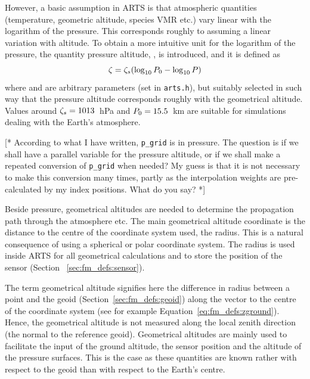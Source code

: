 However, a basic assumption in ARTS is that atmospheric quantities
(temperature, geometric altitude, species VMR etc.) vary linear with
the logarithm of the pressure. This corresponds roughly to assuming a
linear variation with altitude. To obtain a more intuitive unit for the
logarithm of the pressure, the quantity pressure altitude, \PrsAlt, is
introduced, and it is defined as
\begin{equation}
  \zeta = \zeta_{s}(\log_{10}P_{0} - \log_{10}P)
 \label{eq:fm_defs:prsalt}
\end{equation}
where  and  are arbitrary parameters (set in
\verb|arts.h|), but suitably selected in such way that the pressure
altitude corresponds roughly with the geometrical altitude. Values
around $\zeta_{s}=1013$~hPa and $P_{0}=15.5$~km are suitable for
simulations dealing with the Earth's atmosphere. 

[* According to what I have written, \verb|p_grid| is in pressure.
The question is if we shall have a parallel variable for the pressure
altitude, or if we shall make a repeated conversion of \verb|p_grid|
when needed? My guess is that it is not necessary to make this
conversion many times, partly as the interpolation weights are
pre-calculated by my index positions. What do you say? *]

 Beside pressure, geometrical altitudes
are needed to determine the propagation path through the atmosphere
etc. The main geometrical altitude coordinate is the distance to the
centre of the coordinate system used, the radius. This is a natural
consequence of using a spherical or polar coordinate system. The
radius is used inside ARTS for all geometrical calculations and to
store the position of the sensor (Section~ \ref{sec:fm_defs:sensor}).

 The term
geometrical altitude signifies here the difference in radius between a
point and the geoid (Section~\ref{sec:fm_defs:geoid}) along the vector
to the centre of the coordinate system (see for example
Equation~\ref{eq:fm_defs:zground}). Hence, the geometrical altitude is
not measured along the local zenith direction (the normal to the
reference geoid). Geometrical altitudes are mainly used to
facilitate the input of the ground altitude, the sensor position and
the altitude of the pressure surfaces. This is the case as these
quantities are known rather with respect to the geoid than with
respect to the Earth's centre.


